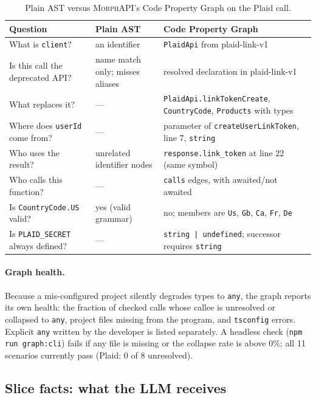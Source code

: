 \documentclass[11pt,a4paper]{article}
\newcommand{\code}[1]{\texttt{#1}}
\newcommand{\morph}{\textsc{MorphAPI}}
\begin{document}
\begin{table}[t]
\centering
\small
\caption{Plain AST versus \morph{}'s Code Property Graph on the Plaid call.}
\label{tab:astvscpg}
\begin{tabularx}{\textwidth}{@{}L L L@{}}
\toprule
Question & Plain AST & Code Property Graph\\
\midrule
What is \code{client}? & an identifier & \code{PlaidApi} from plaid-link-v1\\
Is this call the deprecated API? & name match only; misses aliases & resolved declaration in plaid-link-v1\\
What replaces it? & --- & \code{PlaidApi.linkTokenCreate}, \code{CountryCode}, \code{Products} with types\\
Where does \code{userId} come from? & --- & parameter of \code{createUserLinkToken}, line 7, \code{string}\\
Who uses the result? & unrelated identifier nodes & \code{response.link\_token} at line 22 (same symbol)\\
Who calls this function? & --- & \code{calls} edges, with awaited/not awaited\\
Is \code{CountryCode.US} valid? & yes (valid grammar) & no; members are \code{Us}, \code{Gb}, \code{Ca}, \code{Fr}, \code{De}\\
Is \code{PLAID\_SECRET} always defined? & --- & \code{string | undefined}; successor requires \code{string}\\
\bottomrule
\end{tabularx}
\end{table}

\paragraph{Graph health.}
Because a mis-configured project silently degrades types to \code{any}, the graph reports
its own health: the fraction of checked calls whose callee is unresolved or collapsed to
\code{any}, project files missing from the program, and \code{tsconfig} errors. Explicit
\code{any} written by the developer is listed separately. A headless check
(\code{npm run graph:cli}) fails if any file is missing or the collapse rate is above 0\%;
all 11 scenarios currently pass (Plaid: 0 of 8 unresolved).

\subsection{Slice facts: what the LLM receives}
\end{document}
